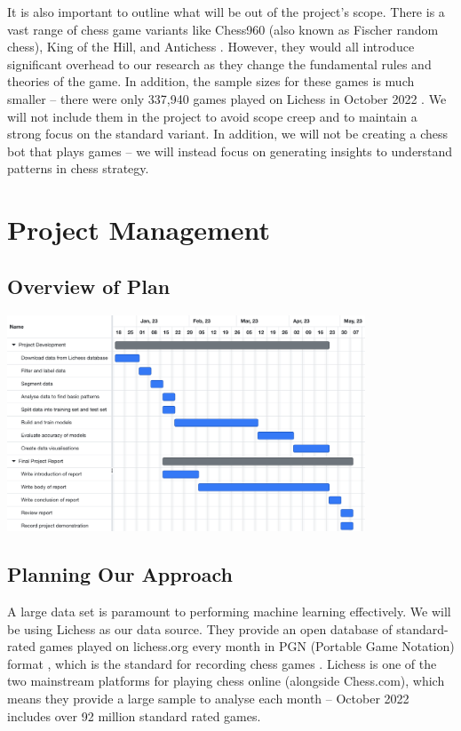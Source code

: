 \documentclass[%
 superscriptaddress,
showpacs,preprintnumbers,
 amsmath,
 amssymb,
 aps,
 pra,
showkeys,
onecolumn,
notitlepage,
11pt,
tightenlines      %
]{revtex4-1}
\begin{document}
It is also important to outline what will be out of the project's scope. There is a vast range of chess game variants like Chess960 (also known as Fischer random chess), King of the Hill, and Antichess \cite{lichessBlitzRatingDistribution}. However, they would all introduce significant overhead to our research as they change the fundamental rules and theories of the game. In addition, the sample sizes for these games is much smaller -- there were only 337,940 games played on Lichess in October 2022 \cite{lichessOpenDatabase}. We will not include them in the project to avoid scope creep and to maintain a strong focus on the standard variant. In addition, we will not be creating a chess bot that plays games -- we will instead focus on generating insights to understand patterns in chess strategy.

\section{Project Management}

\subsection{Overview of Plan}
\begin{center}
    \includegraphics[width=0.8\textwidth]{images/Gantt Chart - Project Management.png}
\end{center}

\subsection{Planning Our Approach}
A large data set is paramount to performing machine learning effectively. We will be using Lichess as our data source. They provide an open database of standard-rated games played on lichess.org every month in PGN (Portable Game Notation) format \cite{lichessOpenDatabase}, which is the standard for recording chess games \cite{pgnExplanation}. Lichess is one of the two mainstream platforms for playing chess online (alongside Chess.com), which means they provide a large sample to analyse each month -- October 2022 includes over 92 million standard rated games.
\end{document}
